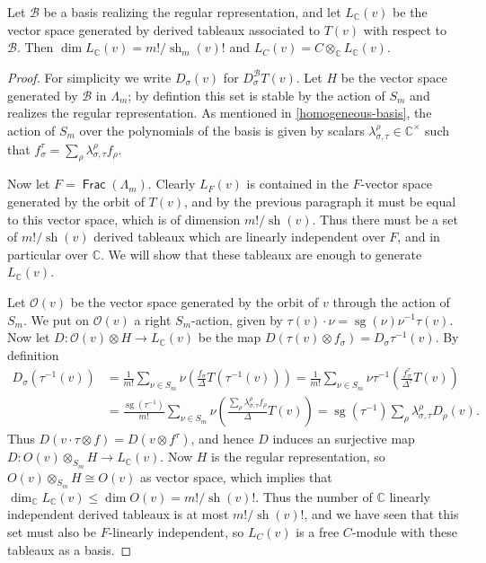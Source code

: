 \documentclass[11pt,fleqn]{article}
\newcommand\CC{\mathbb C}
\newcommand\B{\mathcal B}
\renewcommand\O{\mathcal O}
\newcommand\ot{\otimes}
\renewcommand\to{\longrightarrow}
\DeclareMathOperator\Frac{\mathsf{Frac}}
\DeclareMathOperator\sg{sg}
\DeclareMathOperator\sh{sh}
\begin{document}
\begin{Lemma}
Let $\B$ be a basis realizing the regular representation, and let $L_\CC(v)$
be the vector space generated by derived tableaux associated to $T(v)$ with
respect to $\B$. Then $\dim L_\CC(v) = m!/\sh_m(v)!$ and $L_C(v) = C \ot_\CC
L_\CC(v)$.
\end{Lemma}
\begin{proof}
For simplicity we write $D_\sigma(v)$ for $D_\sigma^\B T(v)$.
Let $H$ be the vector space generated by $\B$ in $\Lambda_m$; by defintion 
this set is stable by the action of $S_m$ and realizes the regular 
representation. As mentioned in \ref{homogeneous-basis}, the action of $S_m$
over the polynomials of the basis is given by scalars 
$\lambda_{\sigma, \tau}^\rho \in \CC^\times$ such that $f_\sigma^\tau = 
\sum_\rho \lambda_{\sigma, \tau}^\rho f_\rho$. 

Now let $F = \Frac(\Lambda_m)$. Clearly $L_F(v)$ is contained in the $F$-vector
space generated by the orbit of $T(v)$, and by the previous paragraph it must
be equal to this vector space, which is of dimension $m!/\sh(v)$. Thus there 
must be a set of $m!/\sh(v)$ derived tableaux which are linearly independent 
over $F$, and in particular over $\CC$. We will show that these tableaux are
enough to generate $L_\CC(v)$.

Let $\O(v)$ be the vector space generated by the orbit of $v$ through the 
action of $S_m$. We put on $\O(v)$ a right $S_m$-action, given by $\tau(v) 
\cdot \nu = \sg(\nu) \nu^{-1}\tau(v)$. Now let $D: \O(v) \ot H \to L_\CC(v)$
be the map $D(\tau(v) \ot f_\sigma) = D_\sigma \tau^{-1}(v)$. By definition
\begin{align*}
D_\sigma (\tau^{-1}(v))
	&= \frac{1}{m!} \sum_{\nu \in S_m} 
		\nu \left(\frac{f_\sigma}{\Delta}T(\tau^{-1}(v))\right)
	= \frac{1}{m!} \sum_{\nu \in S_m} 
		\nu \tau^{-1} \left(\frac{f_\sigma^\tau}{\Delta^\tau}T(v)\right) \\
	&= \frac{\sg(\tau^{-1})}{m!} \sum_{\nu \in S_m} 
		\nu \left(\frac{\sum_\rho \lambda^\rho_{\sigma, \tau} f_\rho}{\Delta}
			T(v)\right)
	= \sg(\tau^{-1}) \sum_\rho \lambda_{\sigma, \tau}^\rho D_\rho (v). 
\end{align*} 
Thus $D(v \cdot \tau \ot f) = D(v \ot f^\tau)$, and hence $D$ induces an 
surjective map $D: O(v) \ot_{S_m} H \to L_\CC(v)$. Now $H$ is the regular
representation, so $O(v) \ot_{S_m} H \cong O(v)$ as vector space, which implies
that $\dim_\CC L_\CC(v) \leq \dim O(v) = m!/\sh(v)!$. Thus the number of $\CC$
linearly independent derived tableaux is at most $m!/\sh(v)!$, and we have
seen that this set must also be $F$-linearly independent, so $L_C(v)$ is 
a free $C$-module with these tableaux as a basis.
\end{proof}
\end{document}
